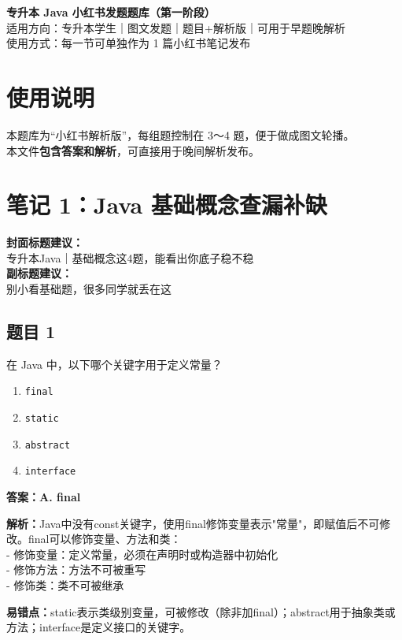 \documentclass[12pt,a4paper]{ctexart}
\begin{document}
\begin{center}
	{\LARGE \textbf{专升本 Java 小红书发题题库（第一阶段）}}\\[0.6em]
	{\large 适用方向：专升本学生｜图文发题｜题目+解析版｜可用于早题晚解析}\\[0.8em]
	{\normalsize 使用方式：每一节可单独作为 1 篇小红书笔记发布}
\end{center}

\vspace{1em}

\section*{使用说明}
本题库为“小红书解析版”，每组题控制在 3～4 题，便于做成图文轮播。\\
本文件\textbf{包含答案和解析}，可直接用于晚间解析发布。

\newpage

\section{笔记 1：Java 基础概念查漏补缺}
\begin{coverbox}
	\textbf{封面标题建议：}\\
	专升本Java｜基础概念这4题，能看出你底子稳不稳\\
	\textbf{副标题建议：}\\
	别小看基础题，很多同学就丢在这
\end{coverbox}

\subsection*{题目 1}
在 Java 中，以下哪个关键字用于定义常量？
\begin{enumerate}[label=\Alph*.]
	\item \texttt{final}
	\item \texttt{static}
	\item \texttt{abstract}
	\item \texttt{interface}
\end{enumerate}

\begin{answerbox}
	\textbf{答案：A. final}

	\textbf{解析：}Java中没有const关键字，使用final修饰变量表示"常量"，即赋值后不可修改。final可以修饰变量、方法和类：\\
	- 修饰变量：定义常量，必须在声明时或构造器中初始化\\
	- 修饰方法：方法不可被重写\\
	- 修饰类：类不可被继承

	\textbf{易错点：}static表示类级别变量，可被修改（除非加final）；abstract用于抽象类或方法；interface是定义接口的关键字。
\end{answerbox}
\end{document}

